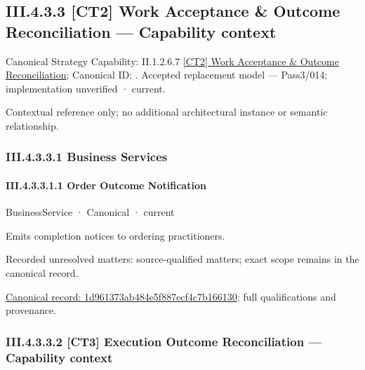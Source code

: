 \subsection*{III.4.3.3 [CT2] Work Acceptance \& Outcome Reconciliation — Capability context}
\label{navigation:III.4.3.3}

{\small Canonical Strategy Capability: II.1.2.6.7 \hyperref[element:64615db0fc2a4198a06d7e08cd0990c0]{[CT2] Work Acceptance \& Outcome Reconciliation}; Canonical ID: \texttt{}. Accepted replacement model — Pass3/014; implementation unverified · current.}\par
Contextual reference only; no additional architectural instance or semantic relationship.\par
\subsubsection*{III.4.3.3.1 Business Services}
\label{navigation:III.4.3.3.1}

\paragraph*{III.4.3.3.1.1 Order Outcome Notification}
\label{navigation:III.4.3.3.1.1}

\label{element:1d961373ab484e5f887ecf4c7b166130}
{\small BusinessService · Canonical · current}\par

Emits completion notices to ordering practitioners.


{\small Recorded unresolved matters: source-qualified matters; exact scope remains in the canonical record.}\par
{\footnotesize \href{../../../../../../../../continuum/business/business-service/1d961373ab484e5f887ecf4c7b166130.md}{Canonical record: 1d961373ab484e5f887ecf4c7b166130}; full qualifications and provenance.}\par
\subsubsection*{III.4.3.3.2 [CT3] Execution Outcome Reconciliation — Capability context}
\label{navigation:III.4.3.3.2}

